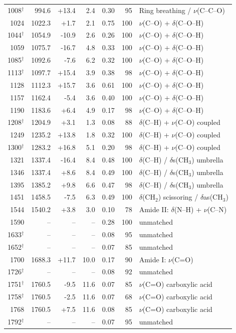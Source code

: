 \documentclass[preprint,12pt]{elsarticle}
\begin{document}
\begin{table}[htbp]
\begin{tabular}{rrrrrrp{4.6cm}}
1008$^{\dagger}$ & 994.6 & +13.4 & 2.4 & 0.30 & 95 & Ring breathing / $\nu$(C--C--O) \\
1024 & 1022.3 & +1.7 & 2.1 & 0.75 & 100 & $\nu$(C--O) + $\delta$(C--O--H) \\
1044$^{\dagger}$ & 1054.9 & -10.9 & 2.6 & 0.26 & 100 & $\nu$(C--O) + $\delta$(C--O--H) \\
1059 & 1075.7 & -16.7 & 4.8 & 0.33 & 100 & $\nu$(C--O) + $\delta$(C--O--H) \\
1085$^{\dagger}$ & 1092.6 & -7.6 & 6.2 & 0.32 & 100 & $\nu$(C--O) + $\delta$(C--O--H) \\
1113$^{\dagger}$ & 1097.7 & +15.4 & 3.9 & 0.38 & 98 & $\nu$(C--O) + $\delta$(C--O--H) \\
1128 & 1112.3 & +15.7 & 3.6 & 0.61 & 100 & $\nu$(C--O) + $\delta$(C--O--H) \\
1157 & 1162.4 & -5.4 & 3.6 & 0.40 & 100 & $\nu$(C--O) + $\delta$(C--O--H) \\
1190 & 1183.6 & +6.4 & 4.9 & 0.17 & 98 & $\nu$(C--O) + $\delta$(C--O--H) \\
1208$^{\dagger}$ & 1204.9 & +3.1 & 1.3 & 0.08 & 88 & $\delta$(C--H) + $\nu$(C--O) coupled \\
1249 & 1235.2 & +13.8 & 1.8 & 0.32 & 100 & $\delta$(C--H) + $\nu$(C--O) coupled \\
1300$^{\dagger}$ & 1283.2 & +16.8 & 5.1 & 0.20 & 98 & $\delta$(C--H) + $\nu$(C--O) coupled \\
1321 & 1337.4 & -16.4 & 8.4 & 0.48 & 100 & $\delta$(C--H) / $\delta$s(CH$_3$) umbrella \\
1346 & 1337.4 & +8.6 & 8.4 & 0.49 & 100 & $\delta$(C--H) / $\delta$s(CH$_3$) umbrella \\
1395 & 1385.2 & +9.8 & 6.6 & 0.47 & 98 & $\delta$(C--H) / $\delta$s(CH$_3$) umbrella \\
1451 & 1458.5 & -7.5 & 6.3 & 0.49 & 100 & $\delta$(CH$_2$) scissoring / $\delta$as(CH$_3$) \\
1544 & 1540.2 & +3.8 & 3.0 & 0.10 & 78 & Amide II: $\delta$(N--H) + $\nu$(C--N) \\
1590 & -- & -- & -- & 0.28 & 100 & unmatched \\
1633$^{\dagger}$ & -- & -- & -- & 0.08 & 95 & unmatched \\
1652$^{\dagger}$ & -- & -- & -- & 0.07 & 85 & unmatched \\
1700 & 1688.3 & +11.7 & 10.0 & 0.17 & 90 & Amide I: $\nu$(C=O) \\
1726$^{\dagger}$ & -- & -- & -- & 0.08 & 92 & unmatched \\
1751$^{\dagger}$ & 1760.5 & -9.5 & 11.6 & 0.07 & 85 & $\nu$(C=O) carboxylic acid \\
1758$^{\dagger}$ & 1760.5 & -2.5 & 11.6 & 0.07 & 68 & $\nu$(C=O) carboxylic acid \\
1768 & 1760.5 & +7.5 & 11.6 & 0.08 & 85 & $\nu$(C=O) carboxylic acid \\
1792$^{\dagger}$ & -- & -- & -- & 0.07 & 95 & unmatched \\
\bottomrule
\end{tabular}
\end{table}
\end{document}
